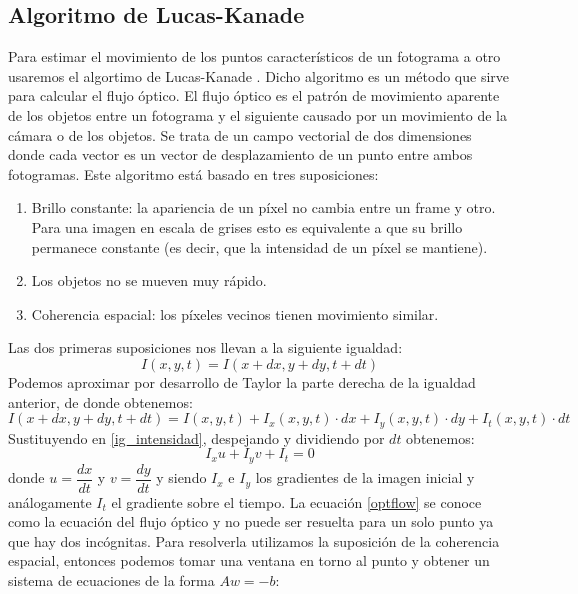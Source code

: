 \documentclass[a4paper,openright, 12pt]{book}
\begin{document}
\subsection{Algoritmo de Lucas-Kanade}
Para estimar el movimiento de los puntos característicos de un fotograma a otro usaremos el algortimo de Lucas-Kanade \cite{LucasKanade}. Dicho algoritmo es un método que sirve para calcular el flujo óptico.
El flujo óptico es el patrón de movimiento aparente de los objetos entre un fotograma y el siguiente causado por un movimiento de la cámara o de los objetos. Se trata de un campo vectorial de dos dimensiones donde cada vector es un vector de desplazamiento de un punto entre ambos fotogramas.
Este algoritmo está basado en tres suposiciones:
\begin{enumerate}
\item Brillo constante: la apariencia de un píxel no cambia entre un frame y otro. Para una imagen en escala de grises esto es equivalente a que su brillo permanece constante (es decir, que la intensidad de un píxel se mantiene).
\item Los objetos no se mueven muy rápido.
\item Coherencia espacial: los píxeles vecinos tienen movimiento similar.
\end{enumerate}
Las dos primeras suposiciones nos llevan a la siguiente igualdad:
\begin{equation} \label{ig_intensidad}
I(x,y,t)=I(x+dx,y+dy,t+dt)
\end{equation}
Podemos aproximar por desarrollo de Taylor la parte derecha de la igualdad anterior, de donde obtenemos:
\begin{equation}
I(x+dx,y+dy,t+dt) = I(x,y,t) + I_x(x,y,t)\cdot dx + I_y(x,y,t)\cdot dy + I_t(x,y,t)\cdot dt
\end{equation}
Sustituyendo en \ref{ig_intensidad}, despejando y dividiendo por $dt$ obtenemos:
\begin{equation}
\label{optflow}
I_x u + I_y v + I_t = 0
\end{equation}
 donde $u= \dfrac{dx}{dt}$ y $v= \dfrac{dy}{dt}$ y siendo $I_x$ e $I_y$ los gradientes de la imagen inicial y análogamente $I_t$ el gradiente sobre el tiempo.
La ecuación \ref{optflow} se conoce como la ecuación del flujo óptico y no puede ser resuelta para un solo punto ya que hay dos incógnitas.
Para resolverla utilizamos la suposición de la coherencia espacial, entonces podemos tomar una ventana en torno al punto y obtener un sistema de ecuaciones de la forma $Aw=-b$:
\end{document}
